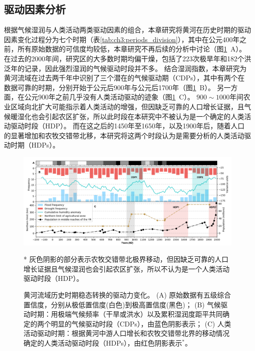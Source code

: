 
\subsection{驱动因素分析}
根据气候湿润与人类活动两类驱动因素的组合，本章研究将黄河在历史时期的驱动因素变化过程分为七个时期（表\ref{tab:ch3:periods_division}），其中在公元400年之前，所有原始数据的可信度均较低，本章研究不再后续的分析中讨论（图\ref{fig:ch3:drivers}~A）。
在过去的2000年间，研究区的大多数时期均偏干燥，包括了223次极旱年和182个洪泛年的记录，因此强烈湿润的气候驱动时段并不多。
结合湿润指数，本章研究为黄河流域在过去两千年中识别了三个潜在的气候驱动期（CDPs），其中有两个在数据可靠的时期，分别开始于公元后900年与公元后1700年（图\ref{fig:ch3:drivers}~B）。
另一方面，在公元900年之前几乎没有人类活动驱动的迹象（图\ref{fig:ch3:drivers}~C）。
$900\sim1000$年间农业区域向北扩大可能指示着人类活动的增强，但因缺乏可靠的人口增长证据，且气候暖湿化也会引起农区扩张，所以此时段在本研究中不被认为是一个确定的人类活动驱动时段（HDP）。
而在这之后的1450年至1650年，以及1900年后，随着人口的显著增加和农牧交错带北移，本研究将这两个时段认为是需要分析的人类活动驱动时期（HDPs）。



\begin{figure}[htb]
    \includegraphics[width=\textwidth]{img/ch3/ch3_drivers.png}
    \caption[黄河流域历史时期稳态转换的驱动力变化]{黄河流域历史时期稳态转换的驱动力变化。
    (A) 原始数据有五级综合置信度，分别从极低置信度(白色)到极高置信度(黑色)；
    (B) 气候驱动时期：用极端气候频率（干旱或洪水）以及累积湿润度距平共同确定的两个明显的气候驱动时段（CDPs），由蓝色阴影表示；
    (C) 人类活动驱动时期：根据黄河中游人口增长和农牧交错带北界的移动情况确定的人类活动驱动时段（HDPs），由红色阴影表示$^*$。}
    \footnotesize
    * 灰色阴影的部分表示农牧交错带北极界移动，但因缺乏可靠的人口增长证据且气候湿润也会引起农区扩张，所以不认为是一个人类活动驱动时段（HDP）。
    \label{fig:ch3:drivers}
\end{figure}

